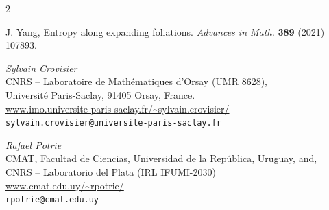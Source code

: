 \documentclass[a4paper,11pt]{amsart}
\numberwithin{equation}{section}     %
\theoremstyle{definition}
\theoremstyle{remark}
\begin{document}
\begin{thebibliography}{2}


 J. Yang, Entropy along expanding foliations. \emph{Advances in Math.}  {\bf 389} (2021) 107893.

\end{thebibliography}
\bigskip

\noindent
\emph{Sylvain Crovisier}\\
{CNRS -- Laboratoire de Math\'ematiques d'Orsay (UMR 8628),\\
Universit\'e Paris-Saclay, 91405 Orsay, France.}\\
\url{www.imo.universite-paris-saclay.fr/~sylvain.crovisier/}\\
\texttt{sylvain.crovisier@universite-paris-saclay.fr}

\bigskip



\noindent
\emph{Rafael Potrie}\\
{CMAT, Facultad de Ciencias, Universidad de la Rep\'ublica, Uruguay, and},\\
{CNRS -- Laboratorio del Plata (IRL IFUMI-2030)}\\
\url{www.cmat.edu.uy/~rpotrie/}\\
\texttt{rpotrie@cmat.edu.uy}
\bigskip
\end{document}
